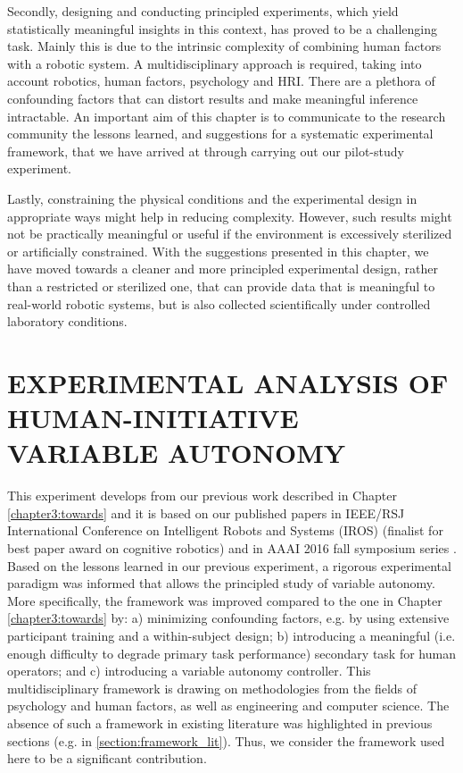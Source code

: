 \documentclass[a4paper,12pt,oneside,openright]{bhamthesis}
\begin{document}
Secondly, designing and conducting principled experiments, which yield statistically meaningful insights in this context, has proved to be a challenging task. Mainly this is due to the intrinsic complexity of combining human factors with a robotic system. A multidisciplinary approach is required, taking into account robotics, human factors, psychology and HRI. There are a plethora of confounding factors that can distort results and make meaningful inference intractable. An important aim of this chapter is to communicate to the research community the lessons learned, and suggestions for a systematic experimental framework, that we have arrived at through carrying out our pilot-study experiment.

Lastly, constraining the physical conditions and the experimental design in appropriate ways might help in reducing complexity. However, such results might not be practically meaningful or useful if the environment is excessively sterilized or artificially constrained. With the suggestions presented in this chapter, we have moved towards a cleaner and more principled experimental design, rather than a restricted or sterilized one, that can provide data that is meaningful to real-world robotic systems, but is also collected scientifically under controlled laboratory conditions.

\chapter{EXPERIMENTAL ANALYSIS OF HUMAN-INITIATIVE VARIABLE AUTONOMY}\label{chapter4:HI}
This experiment develops from our previous work described in Chapter \ref{chapter3:towards} and it is based on our published papers in IEEE/RSJ International Conference on Intelligent Robots and Systems (IROS) \cite{Chiou2016} (finalist for best paper award on cognitive robotics) and in AAAI 2016 fall symposium series \cite{Chiou2016_AAAI}. Based on the lessons learned in our previous experiment, a rigorous experimental paradigm was informed that allows the principled study of variable autonomy. More specifically, the framework was improved compared to the one in Chapter \ref{chapter3:towards} by: a) minimizing confounding factors, e.g. by using extensive participant training and a within-subject design; b) introducing a meaningful (i.e. enough difficulty to degrade primary task performance) secondary task for human operators; and c) introducing a variable autonomy controller.  This multidisciplinary framework is drawing on methodologies from the fields of psychology and human factors, as well as engineering and computer science. The absence of such a framework in existing literature was highlighted in previous sections (e.g. in \ref{section:framework_lit}). Thus, we consider the framework used here to be a significant contribution.
\end{document}
